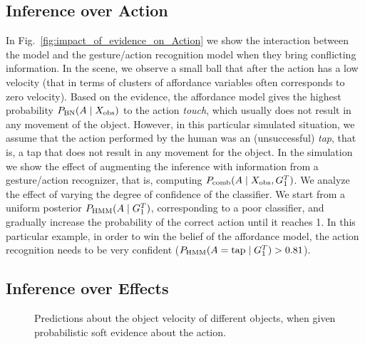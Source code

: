 \subsection{Inference over Action}
\label{sec:results:inference_actions}

In Fig.~\ref{fig:impact_of_evidence_on_Action} we show the interaction between the \AffWords{} model and the gesture/action recognition model when they bring conflicting information.
In the scene, we observe a small ball that after the action has a low velocity (that in terms of clusters of affordance variables often corresponds to zero velocity).
Based on the evidence, the affordance model gives the highest probability $P_{\text{BN}}(A \mid X_\text{obs})$ to the action \emph{touch}, which usually does not result in any movement of the object.
However, in this particular simulated situation, we assume that the action performed by the human was an (unsuccessful) \emph{tap}, that is, a tap that does not result in any movement for the object.
In the simulation we show the effect of augmenting the inference with information from a gesture/action recognizer, that is, computing $P_\text{comb}(A \mid X_\text{obs},G_1^T)$.
We analyze the effect of varying the degree of confidence of the classifier.
We start from a uniform posterior $P_{\text{HMM}}(A \mid G_1^T)$, corresponding to a poor classifier, and gradually increase the probability of the correct action until it reaches 1.
In this particular example, in order to win the belief of the affordance model, the action recognition needs to be very confident ($P_{\text{HMM}}(A=\text{tap} \mid G_1^T) > 0.81$).

\subsection{Inference over Effects}
\label{sec:results:inference_effects}

\begin{figure*}
\centering
{} \quad
%
\caption{Predictions about the object velocity of different objects, when given probabilistic soft evidence about the action.} %
\label{fig:impact_of_evidence_on_ObjVel}
\end{figure*}

